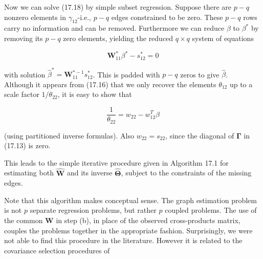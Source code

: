 \documentclass[10pt]{article}
\begin{document}
Now we can solve (17.18) by simple subset regression. Suppose there are $p-q$ nonzero elements in $\gamma_{12}$-i.e., $p-q$ edges constrained to be zero. These $p-q$ rows carry no information and can be removed. Furthermore we can reduce $\beta$ to $\beta^{*}$ by removing its $p-q$ zero elements, yielding the reduced $q \times q$ system of equations


\begin{equation*}
\mathbf{W}_{11}^{*} \beta^{*}-s_{12}^{*}=0 \tag{17.19}
\end{equation*}


with solution $\hat{\beta}^{*}=\mathbf{W}_{11}^{*-1} s_{12}^{*}$. This is padded with $p-q$ zeros to give $\hat{\beta}$.\\
Although it appears from (17.16) that we only recover the elements $\theta_{12}$ up to a scale factor $1 / \theta_{22}$, it is easy to show that


\begin{equation*}
\frac{1}{\theta_{22}}=w_{22}-w_{12}^{T} \beta \tag{17.20}
\end{equation*}


(using partitioned inverse formulas). Also $w_{22}=s_{22}$, since the diagonal of $\boldsymbol{\Gamma}$ in (17.13) is zero.

This leads to the simple iterative procedure given in Algorithm 17.1 for estimating both $\hat{\mathbf{W}}$ and its inverse $\hat{\boldsymbol{\Theta}}$, subject to the constraints of the missing edges.

Note that this algorithm makes conceptual sense. The graph estimation problem is not $p$ separate regression problems, but rather $p$ coupled problems. The use of the common $\mathbf{W}$ in step (b), in place of the observed cross-products matrix, couples the problems together in the appropriate fashion. Surprisingly, we were not able to find this procedure in the literature. However it is related to the covariance selection procedures of
\end{document}

